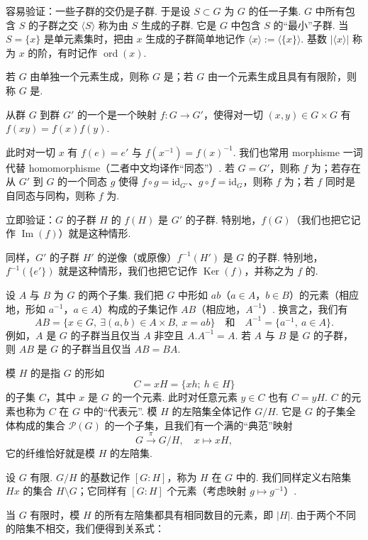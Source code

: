 容易验证：一些子群的交仍是子群. 于是设 $S\subset G$ 为 $G$ 的任一子集. $G$ 中所有包含 $S$ 的子群之交 $\langle S\rangle$ 称为由 $S$ 生成的子群. 它是 $G$ 中包含 $S$ 的``最小''子群. 当 $S=\{x\}$ 是单元素集时，把由 $x$ 生成的子群简单地记作 $\langle x\rangle:=\langle\{x\}\rangle$. 基数 $|\langle x\rangle|$ 称为 $x$ 的阶，有时记作 $\operatorname{ord}(x)$.

若 $G$ 由单独一个元素生成，则称 $G$ 是；若 $G$ 由一个元素生成且具有有限阶，则称 $G$ 是.

\begin{definition}\label{def:fg-1-1-3}
从群 $G$ 到群 $G'$ 的一个是一个映射 $f:G\to G'$，使得对一切 $(x,y)\in G\times G$ 有 $f(xy)=f(x)f(y)$.
\end{definition}

此时对一切 $x$ 有 $f(e)=e'$ 与 $f(x^{-1})=f(x)^{-1}$. 我们也常用 morphisme 一词代替 homomorphisme（二者中文均译作``同态''）. 若 $G=G'$，则称 $f$ 为；若存在从 $G'$ 到 $G$ 的一个同态 $g$ 使得 $f\circ g=\mathrm{id}_{G'}$、$g\circ f=\mathrm{id}_G$，则称 $f$ 为；若 $f$ 同时是自同态与同构，则称 $f$ 为.

立即验证：$G$ 的子群 $H$ 的 $f(H)$ 是 $G'$ 的子群. 特别地，$f(G)$（我们也把它记作 $\operatorname{Im}(f)$）就是这种情形.

同样，$G'$ 的子群 $H'$ 的逆像（或原像）$f^{-1}(H')$ 是 $G$ 的子群. 特别地，$f^{-1}(\{e'\})$ 就是这种情形，我们也把它记作 $\operatorname{Ker}(f)$，并称之为 $f$ 的.

\begin{numpara}\label{np:fg-1-1-4}
设 $A$ 与 $B$ 为 $G$ 的两个子集. 我们把 $G$ 中形如 $ab$（$a\in A$，$b\in B$）的元素（相应地，形如 $a^{-1}$，$a\in A$）构成的子集记作 $AB$（相应地，$A^{-1}$）. 换言之，我们有
\[
AB=\{x\in G,\ \exists(a,b)\in A\times B,\ x=ab\}\quad\text{和}\quad A^{-1}=\{a^{-1},\ a\in A\}.
\]
例如，$A$ 是 $G$ 的子群当且仅当 $A$ 非空且 $A.A^{-1}=A$. 若 $A$ 与 $B$ 是 $G$ 的子群，则 $AB$ 是 $G$ 的子群当且仅当 $AB=BA$.
\end{numpara}

\begin{numpara}\label{np:fg-1-1-5}
模 $H$ 的是指 $G$ 的形如
\[
C=xH=\{xh;\ h\in H\}
\]
的子集 $C$，其中 $x$ 是 $G$ 的一个元素. 此时对任意元素 $y\in C$ 也有 $C=yH$. $C$ 的元素也称为 $C$ 在 $G$ 中的``代表元''. 模 $H$ 的左陪集全体记作 $G/H$. 它是 $G$ 的子集全体构成的集合 $\mathcal{P}(G)$ 的一个子集，且我们有一个满的``典范''映射
\[
G\xrightarrow{\ \pi\ }G/H,\quad x\mapsto xH,
\]
它的纤维恰好就是模 $H$ 的左陪集.

设 $G$ 有限. $G/H$ 的基数记作 $[G:H]$，称为 $H$ 在 $G$ 中的. 我们同样定义右陪集 $Hx$ 的集合 $H\setminus G$；它同样有 $[G:H]$ 个元素（考虑映射 $g\mapsto g^{-1}$）.

当 $G$ 有限时，模 $H$ 的所有左陪集都具有相同数目的元素，即 $|H|$. 由于两个不同的陪集不相交，我们便得到关系式：
\end{numpara}

